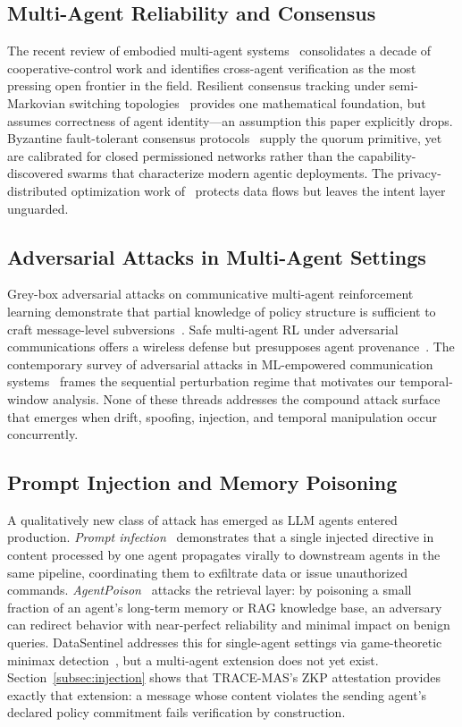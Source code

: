 \documentclass[conference]{IEEEtran}
\begin{document}
\subsection{Multi-Agent Reliability and Consensus}
The recent review of embodied multi-agent systems~\cite{ref:embodied2025}
consolidates a decade of cooperative-control work and identifies
cross-agent verification as the most pressing open frontier in the
field. Resilient consensus tracking under semi-Markovian switching
topologies~\cite{ref:jas2025consensus} provides one mathematical
foundation, but assumes correctness of agent identity---an assumption
this paper explicitly drops. Byzantine fault-tolerant consensus
protocols~\cite{ref:tc2024pbft} supply the quorum primitive, yet are
calibrated for closed permissioned networks rather than the capability-
discovered swarms that characterize modern agentic deployments. The
privacy-distributed optimization work of~\cite{ref:jas2024priv}
protects data flows but leaves the intent layer unguarded.

\subsection{Adversarial Attacks in Multi-Agent Settings}
Grey-box adversarial attacks on communicative multi-agent reinforcement
learning demonstrate that partial knowledge of policy structure is
sufficient to craft message-level subversions~\cite{ref:tifs2025grey}.
Safe multi-agent RL under adversarial communications offers a wireless
defense but presupposes agent provenance~\cite{ref:tifs2024safe}. The
contemporary survey of adversarial attacks in ML-empowered communication
systems~\cite{ref:comst2023} frames the sequential perturbation regime
that motivates our temporal-window analysis. None of these threads
addresses the compound attack surface that emerges when drift, spoofing,
injection, and temporal manipulation occur concurrently.

\subsection{Prompt Injection and Memory Poisoning}
A qualitatively new class of attack has emerged as LLM agents entered
production. \emph{Prompt infection}~\cite{ref:promptinfection2024}
demonstrates that a single injected directive in content processed by
one agent propagates virally to downstream agents in the same pipeline,
coordinating them to exfiltrate data or issue unauthorized commands.
\emph{AgentPoison}~\cite{ref:agentpoison2024} attacks the retrieval
layer: by poisoning a small fraction of an agent's long-term memory or
RAG knowledge base, an adversary can redirect behavior with near-perfect
reliability and minimal impact on benign queries. DataSentinel
addresses this for single-agent settings via game-theoretic
minimax detection~\cite{ref:datasentinel2025}, but a multi-agent
extension does not yet exist. Section~\ref{subsec:injection} shows
that \textsc{TRACE-MAS}'s ZKP attestation provides exactly that
extension: a message whose content violates the sending agent's
declared policy commitment fails verification by construction.
\end{document}
